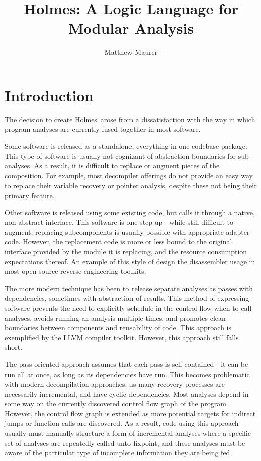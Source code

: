 \documentclass{article}
\newcommand{\sysname}{Holmes}
\begin{document}
\title{\sysname: A Logic Language for Modular Analysis}
\author{Matthew Maurer}
\maketitle
\section{Introduction}
The decision to create \sysname\ arose from a dissatisfaction with the way in which program analyses are currently fused together in most software.

Some software is released as a standalone, everything-in-one codebase package.
This type of software is usually not cognizant of abstraction boundaries for sub-analyses.
As a result, it is difficult to replace or augment pieces of the composition.
For example, most decompiler offerings do not provide an easy way to replace their variable recovery or pointer analysis, despite these not being their primary feature.

Other software is released using some existing code, but calls it through a native, non-abstract interface.
This software is one step up - while still difficult to augment, replacing subcomponents is usually possible with appropriate adapter code.
However, the replacement code is more or less bound to the original interface provided by the module it is replacing, and the resource consumption expectations thereof.
An example of this style of design the disassembler usage in most open source reverse engineering toolkits.

The more modern technique has been to release separate analyses as passes with dependencies, sometimes with abstraction of results.
This method of expressing software prevents the need to explicitly schedule in the control flow when to call analyses, avoids running an analysis multiple times, and promotes clean boundaries between components and reusability of code.
This approach is exemplified by the LLVM compiler toolkit.
However, this approach still falls short.

The pass oriented approach assumes that each pass is self contained - it can be run all at once, as long as its dependencies have run.
This becomes problematic with modern decompilation approaches, as many recovery processes are necessarily incremental, and have cyclic dependencies.
Most analyses depend in some way on the currently discovered control flow graph of the program.
However, the control flow graph is extended as more potential targets for indirect jumps or function calls are discovered.
As a result, code using this approach usually must manually structure a form of incremental analyses where a specific set of analyses are repeatedly called unto fixpoint, and these analyses must be aware of the particular type of incomplete information they are being fed.
\end{document}
